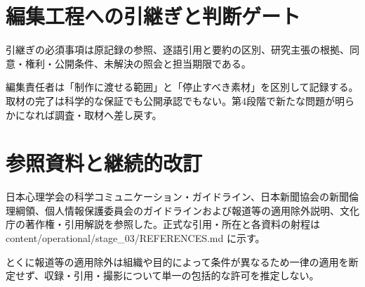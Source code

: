 \documentclass[a4paper,11pt]{article}
\begin{document}
\section{編集工程への引継ぎと判断ゲート}
\par 引継ぎの必須事項は原記録の参照、逐語引用と要約の区別、研究主張の根拠、同意・権利・公開条件、未解決の照会と担当期限である。\par\medskip
\par 編集責任者は「制作に渡せる範囲」と「停止すべき素材」を区別して記録する。取材の完了は科学的な保証でも公開承認でもない。第4段階で新たな問題が明らかになれば調査・取材へ差し戻す。\par\medskip
\section{参照資料と継続的改訂}
\par 日本心理学会の科学コミュニケーション・ガイドライン、日本新聞協会の新聞倫理綱領、個人情報保護委員会のガイドラインおよび報道等の適用除外説明、文化庁の著作権・引用解説を参照した。正式な引用・所在と各資料の射程は content/operational/stage\_03/REFERENCES.md に示す。\par\medskip
\par とくに報道等の適用除外は組織や目的によって条件が異なるため一律の適用を断定せず、収録・引用・撮影について単一の包括的な許可を推定しない。\par\medskip
\end{document}
